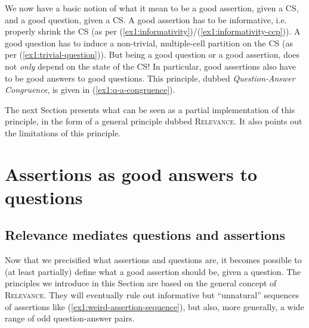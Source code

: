 \begin{exe}
	\label{ex1:trivial-question}
\end{exe}

We now have a basic notion of what it mean to be a good assertion, given a CS, and a good question, given a CS. A good assertion has to be informative, i.e. properly shrink the CS (as per (\ref{ex1:informativity})/(\ref{ex1:informativity-ccp})). A good question has to induce a non-trivial, multiple-cell partition on the CS (as per (\ref{ex1:trivial-question})). But being a good question or a good assertion, does not \textit{only} depend on the state of the CS! In particular, good assertions also have to be good answers to good questions. This principle, dubbed \textit{Question-Answer Congruence}, is given in (\ref{ex1:q-a-congruence}).

\begin{exe}
	\label{ex1:q-a-congruence}
\end{exe}

The next Section presents what can be seen as a partial implementation of this principle, in the form of a general principle dubbed \textsc{Relevance}. It also points out the limitations of this principle.


\section{Assertions as good answers to questions}\label{sec:q-a-interaction}


\subsection{Relevance mediates questions and assertions}
Now that we precisified what assertions and questions are, it becomes possible to (at least partially) define what a good assertion should be, given a question. The principles we introduce in this Section are based on the general concept of \textsc{Relevance}. They will eventually rule out informative but ``unnatural'' sequences of assertions like (\ref{ex1:weird-assertion-sequence}), but also, more generally, a wide range of odd question-answer pairs.

